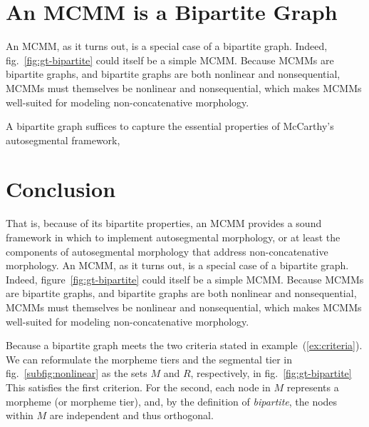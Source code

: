 \section{An MCMM is a Bipartite Graph}\label{sec:bipartite}
An MCMM, as it turns out, is a special case of a bipartite graph. Indeed,
fig.~\ref{fig:gt-bipartite} could itself be a simple MCMM. %
Because MCMMs are bipartite graphs, and bipartite graphs are both nonlinear and nonsequential, 
MCMMs must themselves be nonlinear and nonsequential, which makes MCMMs well-suited for modeling
non-concatenative morphology.

A bipartite graph suffices
to capture the essential properties of McCarthy's autosegmental
framework,



\section{Conclusion}
\label{sec:graph-concl}

That is, because of its bipartite properties, an MCMM provides a sound framework in which to implement autosegmental morphology, or at least the components of autosegmental morphology that address non-concatenative morphology.
An MCMM, as it turns out, is a special case of a bipartite graph. Indeed,
figure~\ref{fig:gt-bipartite} could itself be a simple MCMM. %
Because MCMMs are bipartite graphs, and bipartite graphs are both nonlinear and nonsequential, 
MCMMs must themselves be nonlinear and nonsequential, which makes MCMMs well-suited for modeling
non-concatenative morphology.

Because a bipartite graph meets the two criteria stated in example~(\ref{ex:criteria}).  
We can reformulate the morpheme tiers and the
segmental tier in fig.~\ref{subfig:nonlinear} as the sets $M$ and
$R$, respectively, in fig.~\ref{fig:gt-bipartite} This satisfies the first
criterion. For the second, each node in $M$ represents a morpheme (or
morpheme tier), and, by the definition of \emph{bipartite}, the nodes
within $M$ are independent and thus orthogonal.

